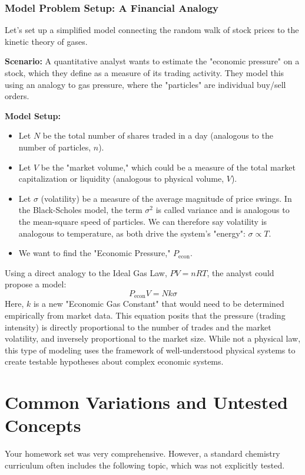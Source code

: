 \documentclass{article}
\begin{document}
\section{Model Problem Setup: A Financial Analogy}
Let's set up a simplified model connecting the random walk of stock prices to the kinetic theory of gases.

\textbf{Scenario:} A quantitative analyst wants to estimate the "economic pressure" on a stock, which they define as a measure of its trading activity. They model this using an analogy to gas pressure, where the "particles" are individual buy/sell orders.

\textbf{Model Setup:}
\begin{itemize}
    \item Let $N$ be the total number of shares traded in a day (analogous to the number of particles, $n$).
    \item Let $V$ be the "market volume," which could be a measure of the total market capitalization or liquidity (analogous to physical volume, $V$).
    \item Let $\sigma$ (volatility) be a measure of the average magnitude of price swings. In the Black-Scholes model, the term $\sigma^2$ is called variance and is analogous to the mean-square speed of particles. We can therefore say volatility is analogous to temperature, as both drive the system's "energy": $\sigma \propto T$.
    \item We want to find the "Economic Pressure," $P_{\text{econ}}$.
\end{itemize}
Using a direct analogy to the Ideal Gas Law, $PV=nRT$, the analyst could propose a model:
\[ P_{\text{econ}}V = N k \sigma \]
Here, $k$ is a new "Economic Gas Constant" that would need to be determined empirically from market data. This equation posits that the pressure (trading intensity) is directly proportional to the number of trades and the market volatility, and inversely proportional to the market size. While not a physical law, this type of modeling uses the framework of well-understood physical systems to create testable hypotheses about complex economic systems.

\part{Common Variations and Untested Concepts}
Your homework set was very comprehensive. However, a standard chemistry curriculum often includes the following topic, which was not explicitly tested.
\end{document}

